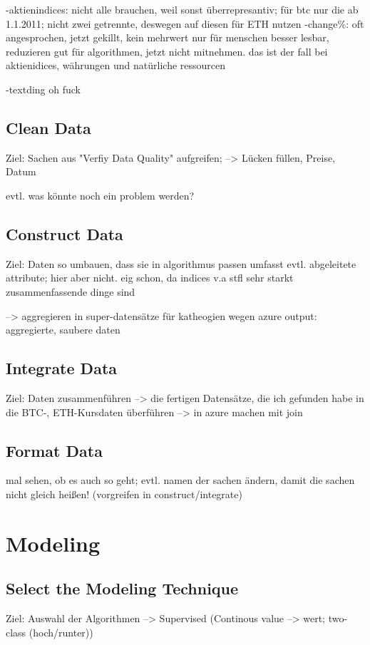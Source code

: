 -aktienindices: nicht alle brauchen, weil sonst überrepresantiv; für btc nur die ab 1.1.2011; nicht zwei getrennte, deswegen auf diesen für ETH nutzen
-change\%: oft angesprochen, jetzt gekillt, kein mehrwert nur für menschen besser lesbar, reduzieren gut für algorithmen, jetzt nicht mitnehmen. das ist der fall bei aktienidices, währungen und natürliche ressourcen

-textding oh fuck




\subsection{Clean Data}
Ziel: Sachen aus "Verfiy Data Quality" aufgreifen;
--> Lücken füllen, Preise, Datum

evtl. was könnte noch ein problem werden?

\subsection{Construct Data}
Ziel: Daten so umbauen, dass sie in algorithmus passen
umfasst evtl. abgeleitete attribute; hier aber nicht. eig schon, da indices v.a stfl sehr starkt zusammenfassende dinge sind

--> aggregieren in super-datensätze für katheogien wegen azure
output: aggregierte, saubere daten


\subsection{Integrate Data}
Ziel: Daten zusammenführen
--> die fertigen Datensätze, die ich gefunden habe in die BTC-, ETH-Kursdaten überführen
--> in azure machen mit join

\subsection{Format Data}
mal sehen, ob es auch so geht; evtl. namen der sachen ändern, damit die sachen nicht gleich heißen! (vorgreifen in construct/integrate)






\section{Modeling}
\subsection{Select the Modeling Technique}
Ziel: Auswahl der Algorithmen
--> Supervised (Continous value --> wert; two-class (hoch/runter))

